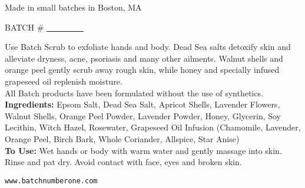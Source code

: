 \documentclass{article}
\begin{document}
\begin{center}
Made in small batches in Boston, MA
\end{center}

\begin{center}
BATCH \# \underline{ \ \ \ \ \ \ \ \ \ }
\end{center}

\noindent
Use Batch Scrub to exfoliate hands and body. Dead Sea salts detoxify
skin and alleviate dryness, acne, psoriasis and many other
ailments. Walnut shells and orange peel gently scrub away rough skin,
while honey and specially infused grapeseed oil replenish moisture.
\\

\noindent
All Batch products have been formulated without the use of synthetics.
\\

\noindent
{\bf Ingredients:} Epsom Salt, Dead Sea Salt, Apricot Shells, Lavender
Flowers, Walnut Shells, Orange Peel Powder, Lavender Powder, Honey,
Glycerin, Soy Lecithin, Witch Hazel, Rosewater, Grapeseed Oil Infusion
(Chamomile, Lavender, Orange Peel, Birch Bark, Whole Coriander,
Allspice, Star Anise)
\\

\noindent
{\bf To Use:} Wet hands or body with warm water and gently massage
into skin. Rinse and pat dry. Avoid contact with face, eyes and broken
skin.


\begin{center}
{\tt www.batchnumberone.com}
\end{center}
\end{document}
